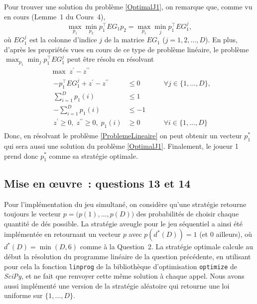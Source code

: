 \documentclass[a4paper,11pt]{amsart}
\theoremstyle{plain}
\begin{document}
Pour trouver une solution du problème \eqref{OptimalJ1}, on remarque que, comme vu en cours (Lemme~1 du Cours~4),
\[
\max_{p_1} \min_{p_2} p_1^\top EG_1 p_2 = \max_{p_1} \min_{j} p_1^\top EG_1^j,
\]
où $EG_1^j$ est la colonne d'indice $j$ de la matrice $EG_1$ ($j = 1, 2, \dotsc, D$). En plus, d'après les propriétés vues en cours de ce type de problème linéaire, le problème $\max_{p_1} \min_{j} p_1^\top EG_1^j$ peut être résolu en résolvant
\begin{equation}
\label{ProblemeLineaire}
\begin{aligned}
& \max\; z^\prime - z^{\prime\prime} \\
& \begin{aligned}
- p_1^\top EG_1^j + z^\prime - z^{\prime\prime} & \leq 0 & \quad & \forall j \in \{1, \dotsc, D\}, \\
\textstyle\sum_{i=1}^D p_1(i) & \leq 1 \\
\textstyle-\sum_{i=1}^D p_1(i) & \leq -1 \\
z^\prime \geq 0,\; z^{\prime\prime}\geq 0,\; p_1(i) & \geq 0 & & \forall i \in \{1, \dotsc, D\}
\end{aligned}
\end{aligned}
\end{equation}
Donc, en résolvant le problème \eqref{ProblemeLineaire} on peut obtenir un vecteur $p_1^\ast$ qui sera aussi une solution du problème \eqref{OptimalJ1}. Finalement, le joueur 1 prend donc $p_1^\ast$ comme sa stratégie optimale.

\subsection{Mise en \oe{}uvre~: questions 13 et 14}

Pour l'implémentation du jeu simultané, on considère qu'une stratégie retourne toujours le vecteur $p = \bigl(p(1), \dotsc, p(D)\bigr)$ des probabilités de choisir chaque quantité de dés possible. La stratégie aveugle pour le jeu séquentiel a ainsi été implémentée en retournant un vecteur $p$ avec $p(d^\ast(D)) = 1$ (et $0$ ailleurs), où $d^\ast(D) = \min(D, 6)$ comme à la Question~2. La stratégie optimale calcule au début la résolution du programme linéaire de la question précédente, en utilisant pour cela la fonction \texttt{linprog} de la bibliothèque d'optimisation \texttt{optimize} de \emph{SciPy}, et ne fait que renvoyer cette même solution à chaque appel. Nous avons aussi implémenté une version de la stratégie aléatoire qui retourne une loi uniforme sur $\{1, \dotsc, D\}$.
\end{document}
